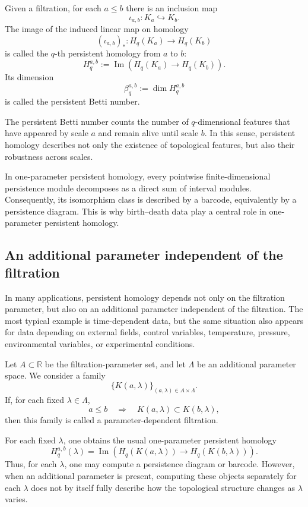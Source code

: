 \documentclass[pdflatex,sn-mathphys-num]{sn-jnl}%
\theoremstyle{thmstyleone}%
\theoremstyle{thmstyletwo}%
\theoremstyle{thmstylethree}%
\begin{document}
Given a filtration, for each \(a\le b\) there is an inclusion map
\[
\iota_{a,b}:K_a\hookrightarrow K_b.
\]
The image of the induced linear map on homology
\[
(\iota_{a,b})_*:H_q(K_a)\to H_q(K_b)
\]
is called the \(q\)-th persistent homology from \(a\) to \(b\):
\[
H_q^{a,b}
:=
\operatorname{Im}\left(H_q(K_a)\to H_q(K_b)\right).
\]
Its dimension
\[
\beta_q^{a,b}:=\dim H_q^{a,b}
\]
is called the persistent Betti number.

The persistent Betti number counts the number of \(q\)-dimensional features that have appeared by scale \(a\) and remain alive until scale \(b\). In this sense, persistent homology describes not only the existence of topological features, but also their robustness across scales.

In one-parameter persistent homology, every pointwise finite-dimensional persistence module decomposes as a direct sum of interval modules. Consequently, its isomorphism class is described by a barcode, equivalently by a persistence diagram. This is why birth--death data play a central role in one-parameter persistent homology.

\subsection{An additional parameter independent of the filtration}

In many applications, persistent homology depends not only on the filtration parameter, but also on an additional parameter independent of the filtration. The most typical example is time-dependent data, but the same situation also appears for data depending on external fields, control variables, temperature, pressure, environmental variables, or experimental conditions.

Let \(A\subset\mathbb R\) be the filtration-parameter set, and let \(\Lambda\) be an additional parameter space. We consider a family
\[
\{K(a,\lambda)\}_{(a,\lambda)\in A\times\Lambda}.
\]
If, for each fixed \(\lambda\in\Lambda\),
\[
a\le b \quad \Longrightarrow \quad K(a,\lambda)\subset K(b,\lambda),
\]
then this family is called a parameter-dependent filtration.

For each fixed \(\lambda\), one obtains the usual one-parameter persistent homology
\[
H_q^{a,b}(\lambda)
=
\operatorname{Im}
\left(
H_q(K(a,\lambda))\to H_q(K(b,\lambda))
\right).
\]
Thus, for each \(\lambda\), one may compute a persistence diagram or barcode. However, when an additional parameter is present, computing these objects separately for each \(\lambda\) does not by itself fully describe how the topological structure changes as \(\lambda\) varies.
\end{document}
